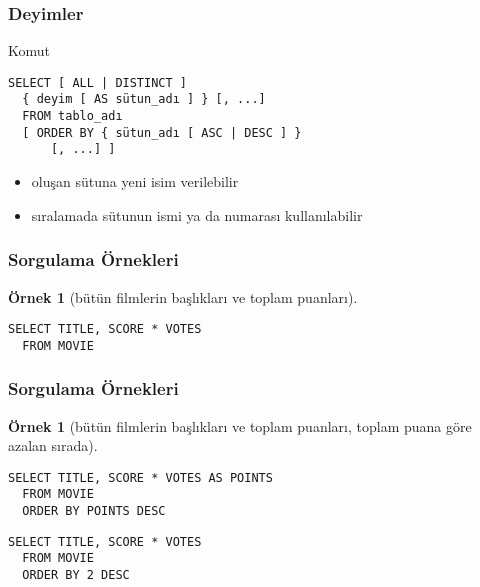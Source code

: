 \documentclass[dvipsnames]{beamer}
\theoremstyle{definition}
\theoremstyle{example}
\newtheorem{ornek}[theorem]{Örnek}
\theoremstyle{plain}
\begin{document}
\begin{frame}[fragile]
  \frametitle{Deyimler}

  \begin{block}{Komut}
    \begin{lstlisting}
SELECT [ ALL | DISTINCT ]
  { deyim [ AS sütun_adı ] } [, ...]
  FROM tablo_adı
  [ ORDER BY { sütun_adı [ ASC | DESC ] }
      [, ...] ]
    \end{lstlisting}
  \end{block}

  \pause
  \begin{itemize}
    \item oluşan sütuna yeni isim verilebilir
    \item sıralamada sütunun ismi ya da numarası kullanılabilir
  \end{itemize}
\end{frame}

\begin{frame}[fragile]
  \frametitle{Sorgulama Örnekleri}

  \begin{ornek}[bütün filmlerin başlıkları ve toplam puanları]
    \begin{lstlisting}
SELECT TITLE, SCORE * VOTES
  FROM MOVIE
    \end{lstlisting}
  \end{ornek}
\end{frame}

\begin{frame}[fragile]
  \frametitle{Sorgulama Örnekleri}

  \begin{ornek}[bütün filmlerin başlıkları ve toplam puanları, toplam puana göre
                azalan sırada]
    \begin{lstlisting}
SELECT TITLE, SCORE * VOTES AS POINTS
  FROM MOVIE
  ORDER BY POINTS DESC
    \end{lstlisting}

    \pause
    \begin{lstlisting}
SELECT TITLE, SCORE * VOTES
  FROM MOVIE
  ORDER BY 2 DESC
    \end{lstlisting}
  \end{ornek}
\end{frame}
\end{document}
